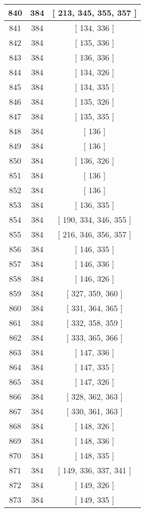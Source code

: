 \begin{center}
\begin{longtable}[H]{|| c c c ||}
\hline
840 & 384 & [ 213, 345, 355, 357 ] \\ 
\hline
841 & 384 & [ 134, 336 ] \\ 
\hline
842 & 384 & [ 135, 336 ] \\ 
\hline
843 & 384 & [ 136, 336 ] \\ 
\hline
844 & 384 & [ 134, 326 ] \\ 
\hline
845 & 384 & [ 134, 335 ] \\ 
\hline
846 & 384 & [ 135, 326 ] \\ 
\hline
847 & 384 & [ 135, 335 ] \\ 
\hline
848 & 384 & [ 136 ] \\ 
\hline
849 & 384 & [ 136 ] \\ 
\hline
850 & 384 & [ 136, 326 ] \\ 
\hline
851 & 384 & [ 136 ] \\ 
\hline
852 & 384 & [ 136 ] \\ 
\hline
853 & 384 & [ 136, 335 ] \\ 
\hline
854 & 384 & [ 190, 334, 346, 355 ] \\ 
\hline
855 & 384 & [ 216, 346, 356, 357 ] \\ 
\hline
856 & 384 & [ 146, 335 ] \\ 
\hline
857 & 384 & [ 146, 336 ] \\ 
\hline
858 & 384 & [ 146, 326 ] \\ 
\hline
859 & 384 & [ 327, 359, 360 ] \\ 
\hline
860 & 384 & [ 331, 364, 365 ] \\ 
\hline
861 & 384 & [ 332, 358, 359 ] \\ 
\hline
862 & 384 & [ 333, 365, 366 ] \\ 
\hline
863 & 384 & [ 147, 336 ] \\ 
\hline
864 & 384 & [ 147, 335 ] \\ 
\hline
865 & 384 & [ 147, 326 ] \\ 
\hline
866 & 384 & [ 328, 362, 363 ] \\ 
\hline
867 & 384 & [ 330, 361, 363 ] \\ 
\hline
868 & 384 & [ 148, 326 ] \\ 
\hline
869 & 384 & [ 148, 336 ] \\ 
\hline
870 & 384 & [ 148, 335 ] \\ 
\hline
871 & 384 & [ 149, 336, 337, 341 ] \\ 
\hline
872 & 384 & [ 149, 326 ] \\ 
\hline
873 & 384 & [ 149, 335 ] \\ 

\end{longtable}
\end{center}
